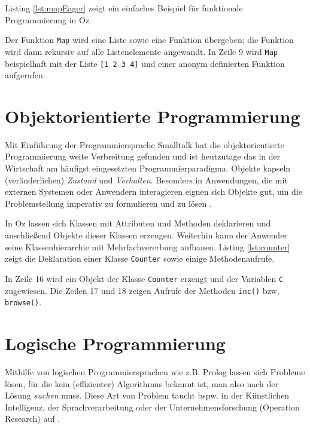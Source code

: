 Listing \ref{lst:mapEager} zeigt ein einfaches Beispiel für funktionale
Programmierung in Oz.



Der Funktion \texttt{Map} wird eine Liste sowie eine Funktion übergeben; die 
Funktion wird dann rekursiv auf alle Listenelemente angewandt. In Zeile 9 wird 
\texttt{Map} beispielhaft mit der Liste \texttt{[1 2 3 4]} und einer anonym 
definierten Funktion aufgerufen.

\section{Objektorientierte Programmierung}
Mit Einführung der Programmiersprache Smalltalk hat die objektorientierte 
Programmierung weite Verbreitung gefunden und ist heutzutage das in der 
Wirtschaft am häufigst eingesetzten Programmierparadigma. Objekte kapseln 
(veränderlichen) \textsl{Zustand} und \textsl{Verhalten}. Besonders in 
Anwendungen, die mit externen Systemen oder Anwendern interagieren eignen sich 
Objekte gut, um die Problemstellung imperativ zu formulieren und zu lösen 
\cite{KI-LP96}.

In Oz lassen sich Klassen mit Attributen und Methoden deklarieren und 
anschließend Objekte dieser Klassen erzeugen. Weiterhin kann der Anwender seine
Klassenhierarchie mit Mehrfachvererbung aufbauen. Listing \ref{lst:counter}
zeigt die Deklaration einer Klasse \texttt{Counter} sowie einige
Methodenaufrufe. 



In Zeile 16 wird ein Objekt der Klasse \texttt{Counter} erzeugt und der
Variablen \texttt{C} zugewiesen. Die Zeilen 17 und 18 zeigen Aufrufe der
Methoden \texttt{inc()} bzw. \texttt{browse()}.

\section{Logische Programmierung}
Mithilfe von logischen Programmiersprachen wie z.B. Prolog lassen sich Probleme
lösen, für die kein (effizienter) Algorithmus bekannt ist, man also nach der
Lösung \textsl{suchen} muss. Diese Art von Problem taucht bspw. in der
Künstlichen Intelligenz, der Sprachverarbeitung oder der Unternehmensforschung
(Operation Research) auf \cite[Tutorial of Oz,
Chapter 12]{url:mozart-documentation}.


